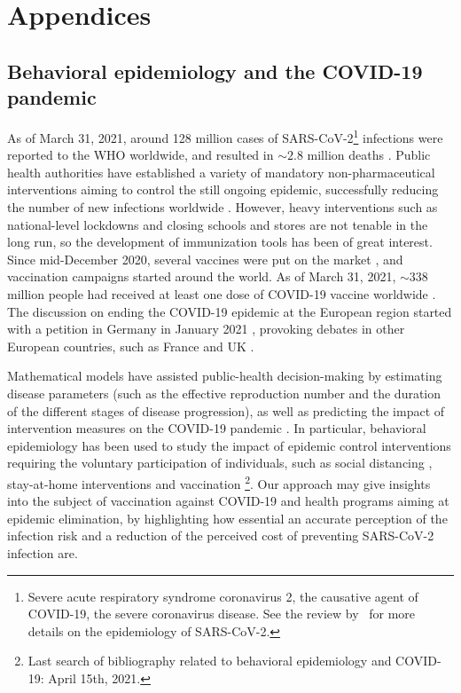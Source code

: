 \let\cleardoublepage\clearpage 
\renewcommand\setthesection{\Alph{section}} 

\chapter*{Appendices}

\section{Behavioral epidemiology and the COVID-19 pandemic}
\label{BehavEpiCOVID}

As of March 31, 2021, around 128 million cases of SARS-CoV-2\footnote{Severe acute respiratory syndrome coronavirus 2, the causative agent of COVID-19, the severe coronavirus disease. See the review by~\cite{Salzberger2020} for more details on the epidemiology of SARS-CoV-2.} infections were reported to the WHO worldwide, and resulted in $\sim2.8$ million deaths \cite[]{WHO_CovidDashboard}. Public health authorities have established a variety of mandatory non-pharmaceutical interventions aiming to control the still ongoing epidemic, successfully reducing the number of new infections worldwide \cite[]{Bo2021}. However, heavy interventions such as national-level lockdowns and closing schools and stores are not tenable in the long run, so the development of immunization tools has been of great interest. Since mid-December 2020, several vaccines were put on the market \cite[]{WHO_CovidVaccines}, and vaccination campaigns started around the world. As of March 31, 2021, $\sim338$ million people had received at least one dose of COVID-19 vaccine worldwide \cite[]{OWID_CovidVaccination}. The discussion on ending the COVID-19 epidemic at the European region started with a petition in Germany in January 2021 \cite[]{ZeroCovid_EU}, provoking debates in other European countries, such as France \cite[]{ZeroCovid_FR} and UK \cite[]{ZeroCovid_UK}. 

Mathematical models have assisted public-health decision-making by estimating disease parameters (such as the effective reproduction number and the duration of the different stages of disease progression), as well as predicting the impact of intervention measures on the COVID-19 pandemic \cite[]{Xiang2021}. In particular, behavioral epidemiology has been used to study the impact of epidemic control interventions requiring the voluntary participation of individuals, such as social distancing \cite[]{Gupta2020}, stay-at-home interventions \cite[]{Kabir2020} and vaccination \cite[]{Choi2020,Jentsch2021}\footnote{Last search of bibliography related to behavioral epidemiology and COVID-19: April 15th, 2021.}. Our approach may give insights into the subject of vaccination against COVID-19 and health programs aiming at epidemic elimination, by highlighting how essential an accurate perception of the infection risk and a reduction of the perceived cost of preventing SARS-CoV-2 infection are. 


